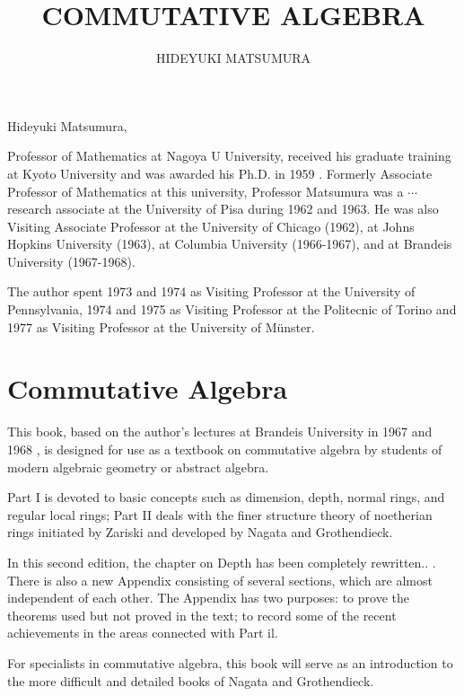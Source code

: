 

\title{COMMUTATIVE ALGEBRA }


\author{HIDEYUKI MATSUMURA}
\date{}


\newcommand\longdiv[1]{\overline{\smash{)}#1}}



\maketitle
Hideyuki Matsumura,

Professor of Mathematics at Nagoya U University, received his graduate training at Kyoto University and was awarded his Ph.D. in 1959 . Formerly Associate Professor of Mathematics at this university, Professor Matsumura was a $\cdots$ research associate at the University of Pisa during 1962 and 1963. He was also Visiting Associate Professor at the University of Chicago (1962), at Johns Hopkins University (1963), at Columbia University (1966-1967), and at Brandeis University (1967-1968).

The author spent 1973 and 1974 as Visiting Professor at the University of Pennsylvania, 1974 and 1975 as Visiting Professor at the Politecnic of Torino and 1977 as Visiting Professor at the University of Münster.

\section{Commutative Algebra}
This book, based on the author's lectures at Brandeis University in 1967 and 1968 , is designed for use as a textbook on commutative algebra by students of modern algebraic geometry or abstract algebra.

Part I is devoted to basic concepts such as dimension, depth, normal rings, and regular local rings; Part II deals with the finer structure theory of noetherian rings initiated by Zariski and developed by Nagata and Grothendieck.

In this second edition, the chapter on Depth has been completely rewritten.. . There is also a new Appendix consisting of several sections, which are almost independent of each other. The Appendix has two purposes: to prove the theorems used but not proved in the text; to record some of the recent achievements in the areas connected with Part il.

For specialists in commutative algebra, this book will serve as an introduction to the more difficult and detailed books of Nagata and Grothendieck.

